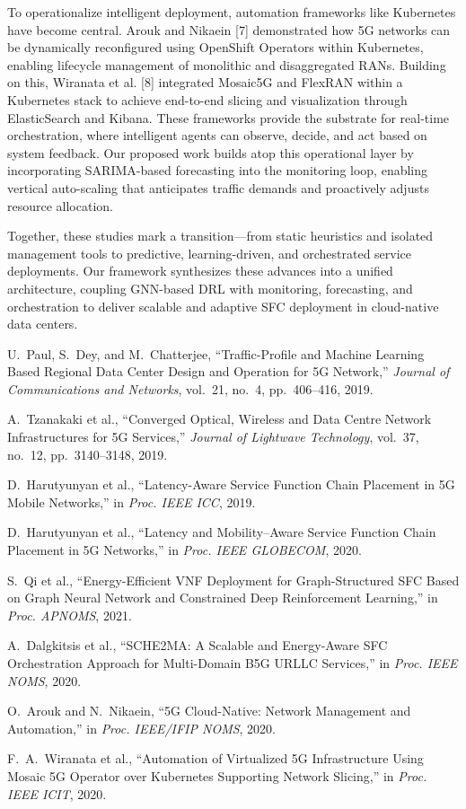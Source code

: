 \documentclass[conference]{IEEEtran}
\begin{document}
To operationalize intelligent deployment, automation frameworks like Kubernetes have become central. Arouk and Nikaein [7] demonstrated how 5G networks can be dynamically reconfigured using OpenShift Operators within Kubernetes, enabling lifecycle management of monolithic and disaggregated RANs. Building on this, Wiranata et al. [8] integrated Mosaic5G and FlexRAN within a Kubernetes stack to achieve end-to-end slicing and visualization through ElasticSearch and Kibana. These frameworks provide the substrate for real-time orchestration, where intelligent agents can observe, decide, and act based on system feedback. Our proposed work builds atop this operational layer by incorporating SARIMA-based forecasting into the monitoring loop, enabling vertical auto-scaling that anticipates traffic demands and proactively adjusts resource allocation.

Together, these studies mark a transition—from static heuristics and isolated management tools to predictive, learning-driven, and orchestrated service deployments. Our framework synthesizes these advances into a unified architecture, coupling GNN-based DRL with monitoring, forecasting, and orchestration to deliver scalable and adaptive SFC deployment in cloud-native data centers.

\begin{thebibliography}{99}

U.~Paul, S.~Dey, and M.~Chatterjee, ``Traffic-Profile and Machine Learning Based Regional Data Center Design and Operation for 5G Network,'' \textit{Journal of Communications and Networks}, vol.~21, no.~4, pp.~406--416, 2019.

A.~Tzanakaki et al., ``Converged Optical, Wireless and Data Centre Network Infrastructures for 5G Services,'' \textit{Journal of Lightwave Technology}, vol.~37, no.~12, pp.~3140--3148, 2019.

D.~Harutyunyan et al., ``Latency-Aware Service Function Chain Placement in 5G Mobile Networks,'' in \textit{Proc. IEEE ICC}, 2019.

D.~Harutyunyan et al., ``Latency and Mobility–Aware Service Function Chain Placement in 5G Networks,'' in \textit{Proc. IEEE GLOBECOM}, 2020.

S.~Qi et al., ``Energy-Efficient VNF Deployment for Graph-Structured SFC Based on Graph Neural Network and Constrained Deep Reinforcement Learning,'' in \textit{Proc. APNOMS}, 2021.

A.~Dalgkitsis et al., ``SCHE2MA: A Scalable and Energy-Aware SFC Orchestration Approach for Multi-Domain B5G URLLC Services,'' in \textit{Proc. IEEE NOMS}, 2020.

O.~Arouk and N.~Nikaein, ``5G Cloud-Native: Network Management and Automation,'' in \textit{Proc. IEEE/IFIP NOMS}, 2020.

F.~A.~Wiranata et al., ``Automation of Virtualized 5G Infrastructure Using Mosaic 5G Operator over Kubernetes Supporting Network Slicing,'' in \textit{Proc. IEEE ICIT}, 2020.

\end{thebibliography}
\end{document}
